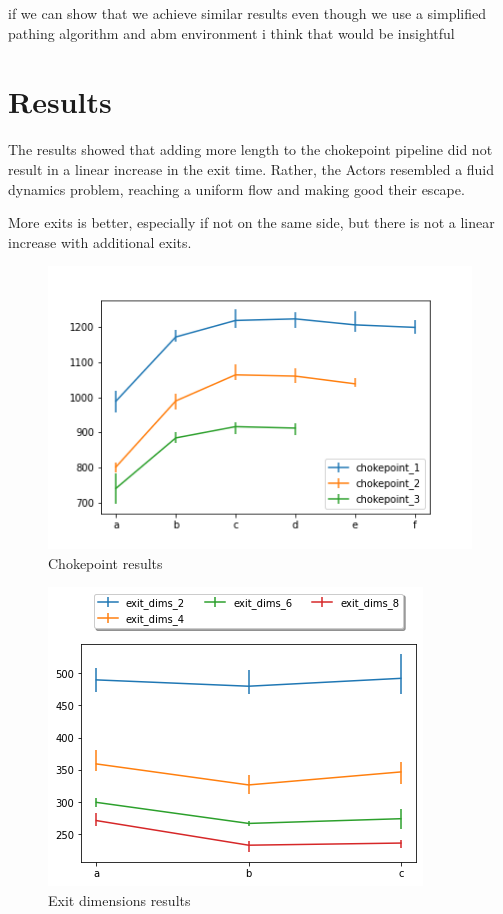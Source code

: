 \documentclass[12pt,letterpaper]{article}
\begin{document}
if we can show that we achieve similar results even though we use a simplified pathing algorithm and abm environment i think that would be insightful



\section{Results}

The results showed that adding more length to the chokepoint pipeline did not
result in a linear increase in the exit time. Rather, the Actors resembled a
fluid dynamics problem, reaching a uniform flow and making good their escape.

More exits is better, especially if not on the same side, but there is not a
linear increase with additional exits.

\begin{figure}
  \centering
  \includegraphics[width=.9\linewidth]{./figures/chokepoint_graph.png}
  \caption{Chokepoint results}
\end{figure}
\begin{figure}
  \centering
  \includegraphics[width=.75\linewidth]{./figures/exit_dims_graph.png}
  \caption{Exit dimensions results}
\end{figure}
\end{document}

